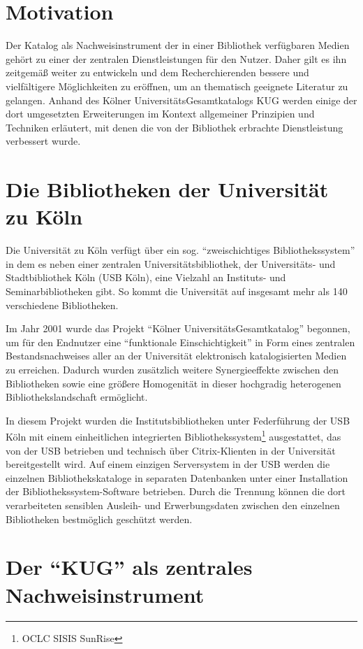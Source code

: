 \documentclass[11pt]{scrartcl}
\begin{document}
\tableofcontents
\section{Motivation}

Der Katalog als Nachweisinstrument der in einer Bibliothek verfügbaren
Medien gehört zu einer der zentralen Dienstleistungen für den
Nutzer. Daher gilt es ihn zeitgemäß weiter zu entwickeln und dem
Recherchierenden bessere und vielfältigere Möglichkeiten zu eröffnen,
um an thematisch geeignete Literatur zu gelangen. Anhand des Kölner
UniversitätsGesamtkatalogs KUG werden einige der dort umgesetzten
Erweiterungen im Kontext allgemeiner Prinzipien und Techniken
erläutert, mit denen die von der Bibliothek erbrachte Dienstleistung
verbessert wurde.

\section{Die Bibliotheken der Universität zu Köln}

Die Universität zu Köln verfügt über ein sog. "`zweischichtiges
Bibliothekssystem"'\cite{Bauer:2004} in dem es neben einer zentralen
Universitätsbibliothek, der Universitäts- und Stadtbibliothek Köln
(USB Köln), eine Vielzahl an Instituts- und Seminarbibliotheken gibt.
So kommt die Universität auf insgesamt mehr als 140 verschiedene
Bibliotheken.

Im Jahr 2001 wurde das Projekt "`Kölner UniversitätsGesamtkatalog"'
begonnen, um für den Endnutzer eine "`funktionale Einschichtigkeit"'
in Form eines zentralen Bestandsnachweises aller an der Universität
elektronisch katalogisierten Medien zu erreichen. Dadurch wurden
zusätzlich weitere Synergieeffekte zwischen den Bibliotheken sowie
eine größere Homogenität in dieser hochgradig heterogenen
Bibliothekslandschaft ermöglicht.

In diesem Projekt wurden die Institutsbibliotheken unter Federführung
der USB Köln mit einem einheitlichen integrierten
Bibliothekssystem\footnote{OCLC SISIS SunRise} ausgestattet, das von
der USB betrieben und technisch über Citrix-Klienten in der
Universität bereitgestellt wird. Auf einem einzigen Serversystem in
der USB werden die einzelnen Bibliothekskataloge in separaten
Datenbanken unter einer Installation der Bibliothekssystem-Software
betrieben. Durch die Trennung können die dort verarbeiteten sensiblen
Ausleih- und Erwerbungsdaten zwischen den einzelnen Bibliotheken
bestmöglich geschützt werden.

\section{Der "`KUG"' als zentrales Nachweisinstrument}
\end{document}
